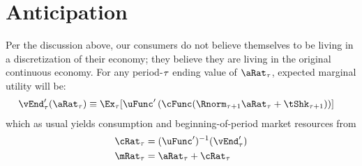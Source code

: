 \documentclass[\econtexRoot/BufferStockTheory.tex]{subfiles}
\begin{document}
\section{Anticipation}
Per the discussion above, our consumers do not believe themselves to be living in a discretization of their economy; they believe they are living in the original continuous economy.
For any period-$\tau$ ending value of $\pnt_{\tAbs}$, expected marginal utility will be:
\begin{align}
  \vEnd^{\prime}_{\tAbs}(\pnt_{\tAbs}) & \equiv \Ex_{\tAbs}[\uFunc^{\prime}\left(\cFunc(\Rnorm_{\tAbs+1} \pnt_{\tAbs} + \tShk_{\tAbs+1})\right)]
\end{align}
which as usual yields consumption and beginning-of-period market resources from
\begin{align}
  \cRat_{\tAbs} & = (\uFunc^{\prime})^{-1}(\vEnd^{\prime}_{\tAbs})
  \\ \mRat_{\tAbs} & = \pnt_{\tAbs}+\cRat_{\tAbs}
\end{align}
\pagebreak
\onlyinsubfile{}
\appendix
\end{document}
